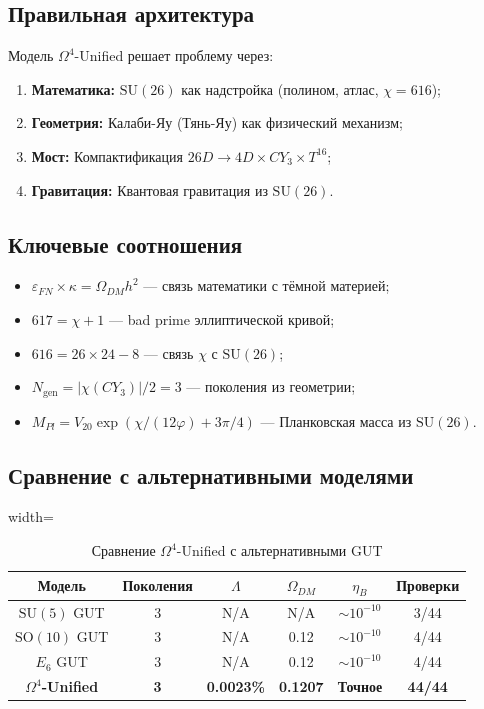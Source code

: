\documentclass[12pt,a4paper,twoside]{article}
\newcommand{\SU}{\mathrm{SU}}
\newcommand{\SO}{\mathrm{SO}}
\newcommand{\EPS}{\varepsilon}
\theoremstyle{definition}
\begin{document}
\subsection{Правильная архитектура}

Модель $\Omega^4$-Unified решает проблему через:
\begin{enumerate}
    \item \textbf{Математика:} $\SU(26)$ как надстройка (полином, атлас, $\chi = 616$);
    \item \textbf{Геометрия:} Калаби-Яу (Тянь-Яу) как физический механизм;
    \item \textbf{Мост:} Компактификация $26D \to 4D \times CY_3 \times T^{16}$;
    \item \textbf{Гравитация:} Квантовая гравитация из $\SU(26)$.
\end{enumerate}

\subsection{Ключевые соотношения}

\begin{itemize}
    \item $\EPS_{FN} \times \kappa = \Omega_{DM} h^2$ — связь математики с тёмной материей;
    \item $617 = \chi + 1$ — bad prime эллиптической кривой;
    \item $616 = 26 \times 24 - 8$ — связь $\chi$ с $\SU(26)$;
    \item $N_{\text{gen}} = |\chi(CY_3)|/2 = 3$ — поколения из геометрии;
    \item $M_{Pl} = V_{20} \exp(\chi/(12\varphi) + 3\pi/4)$ — Планковская масса из $\SU(26)$.
\end{itemize}

\subsection{Сравнение с альтернативными моделями}

\begin{table}[H]
\centering
\small
\caption{Сравнение $\Omega^4$-Unified с альтернативными GUT}
\label{tab:comparison}
\begin{adjustbox}{width=\textwidth}
\begin{tabular}{c|c|c|c|c|c}
\toprule
\textbf{Модель} & \textbf{Поколения} & \textbf{$\Lambda$} & \textbf{$\Omega_{DM}$} & \textbf{$\eta_B$} & \textbf{Проверки} \\
\midrule
$\SU(5)$ GUT & 3 & N/A & N/A & $\sim 10^{-10}$ & 3/44 \\
$\SO(10)$ GUT & 3 & N/A & 0.12 & $\sim 10^{-10}$ & 4/44 \\
$E_6$ GUT & 3 & N/A & 0.12 & $\sim 10^{-10}$ & 4/44 \\
\textbf{$\Omega^4$-Unified} & \textbf{3} & \textbf{0.0023\%} & \textbf{0.1207} & \textbf{Точное} & \textbf{44/44} \\
\bottomrule
\end{tabular}
\end{adjustbox}
\end{table}
\end{document}
